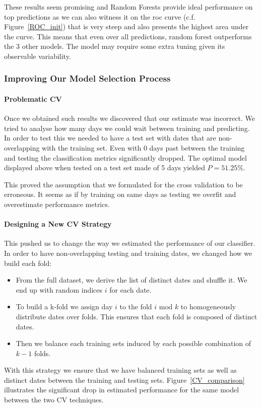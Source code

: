 \vspace{\baselineskip}
These results seem promising and Random Forests provide ideal performance on top predictions as we can also witness it on the \acrshort{roc} curve (c.f. Figure~\ref{ROC_init}) that is very steep and also presents the highest area under the curve. This means that even over all predictions, random forest outperforms the 3 other models. The model may require some extra tuning given its observable variability. 

\subsubsection{Improving Our Model Selection Process}
\paragraph{Problematic CV} Once we obtained such results we discovered that our estimate was incorrect. We tried to analyse how many days we could wait between training and predicting. In order to test this we needed to have a test set with dates that are non-overlapping with the training set. Even with 0 days past between the training and testing the classification metrics significantly dropped. The optimal model displayed above when tested on a test set made of 5 days yielded $P=51.25\%$. 

This proved the assumption that we formulated for the cross validation to be erroneous. It seems as if by training on same days as testing we overfit and overestimate performance metrics.	

\paragraph{Designing a New CV Strategy}
This pushed us to change the way we estimated the performance of our classifier. In order to have non-overlapping testing and training dates, we changed how we build each fold:
\begin{itemize}[noitemsep]
	\item From the full dataset, we derive the list of distinct dates and shuffle it. We end up with random indices $i$ for each date.
	\item To build a k-fold we assign day $i$ to the fold $i \text{ mod } k$ to homogeneously distribute dates over folds. This ensures that each fold is composed of distinct dates.
	\item Then we balance each training sets induced by each possible combination of $k-1$ folds.
\end{itemize}
With this strategy we ensure that we have balanced training sets as well as distinct dates between the training and testing sets. Figure~\ref{CV_comparison} illustrates the significant drop in estimated performance for the same model between the two CV techniques. 

